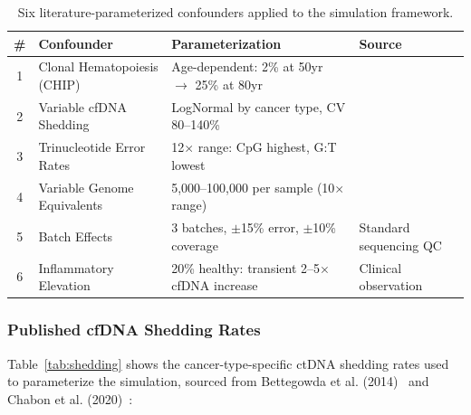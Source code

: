 \documentclass[10pt,a4paper]{article}
\begin{document}
\begin{table}[H]
\centering
\caption{Six literature-parameterized confounders applied to the simulation framework.}
\label{tab:confounders}
\begin{tabular}{c p{3.5cm} p{4cm} p{3cm}}
\toprule
\textbf{\#} & \textbf{Confounder} & \textbf{Parameterization} & \textbf{Source} \\
\midrule
1 & Clonal Hematopoiesis (CHIP) & Age-dependent: 2\% at 50yr $\rightarrow$ 25\% at 80yr & \cite{genovese2014clonal,jaiswal2014age} \\
2 & Variable cfDNA Shedding & LogNormal by cancer type, CV 80--140\% & \cite{bettegowda2014detection,chabon2020integrating} \\
3 & Trinucleotide Error Rates & 12$\times$ range: CpG highest, G:T lowest & \cite{newman2016integrated,phallen2017direct} \\
4 & Variable Genome Equivalents & 5,000--100,000 per sample (10$\times$ range) & \cite{snyder2016cell} \\
5 & Batch Effects & 3 batches, $\pm$15\% error, $\pm$10\% coverage & Standard sequencing QC \\
6 & Inflammatory Elevation & 20\% healthy: transient 2--5$\times$ cfDNA increase & Clinical observation \\
\bottomrule
\end{tabular}
\end{table}

\subsubsection{Published cfDNA Shedding Rates}

Table~\ref{tab:shedding} shows the cancer-type-specific ctDNA shedding rates used to parameterize the simulation, sourced from Bettegowda et al. (2014)~\cite{bettegowda2014detection} and Chabon et al. (2020)~\cite{chabon2020integrating}:
\end{document}

